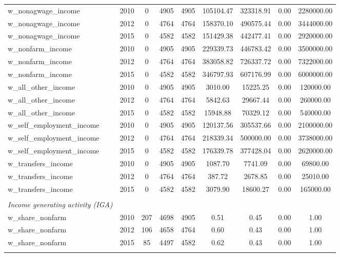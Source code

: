 \documentclass[a4paper,11pt]{article}
\begin{document}
\begin{table}[H]
{\begin{tabular}{lcccccccc}
   w\_nonagwage\_income & 2010  & 0     & 4905  & 4905  & 105104.47 & 323318.91 & 0.00  & 2280000.00 \\
    w\_nonagwage\_income & 2012  & 0     & 4764  & 4764  & 158370.10 & 490575.44 & 0.00  & 3444000.00 \\
    w\_nonagwage\_income & 2015  & 0     & 4582  & 4582  & 151429.38 & 442477.41 & 0.00  & 2920000.00 \\
    w\_nonfarm\_income & 2010  & 0     & 4905  & 4905  & 229339.73 & 446783.42 & 0.00  & 3500000.00 \\
    w\_nonfarm\_income & 2012  & 0     & 4764  & 4764  & 383058.82 & 726337.72 & 0.00  & 7322000.00 \\
    w\_nonfarm\_income & 2015  & 0     & 4582  & 4582  & 346797.93 & 607176.99 & 0.00  & 6000000.00 \\
w\_all\_other\_income & 2010  & 0     & 4905  & 4905  & 3010.00 & 15225.25 & 0.00  & 120000.00 \\
    w\_all\_other\_income & 2012  & 0     & 4764  & 4764  & 5842.63 & 29667.44 & 0.00  & 260000.00 \\
    w\_all\_other\_income & 2015  & 0     & 4582  & 4582  & 15948.88 & 70329.12 & 0.00  & 540000.00 \\
       w\_self\_employment\_income & 2010  & 0     & 4905  & 4905  & 120137.56 & 305537.66 & 0.00  & 2100000.00 \\
    w\_self\_employment\_income & 2012  & 0     & 4764  & 4764  & 218339.34 & 500000.00 & 0.00  & 3738000.00 \\
    w\_self\_employment\_income & 2015  & 0     & 4582  & 4582  & 176339.78 & 377428.04 & 0.00  & 2620000.00 \\
      w\_transfers\_income & 2010  & 0     & 4905  & 4905  & 1087.70 & 7741.09 & 0.00  & 69800.00 \\
    w\_transfers\_income & 2012  & 0     & 4764  & 4764  & 387.72 & 2678.85 & 0.00  & 25010.00 \\
    w\_transfers\_income & 2015  & 0     & 4582  & 4582  & 3079.90 & 18600.27 & 0.00  & 165000.00 \\
   
   

        & & & & & & & & \\

     \textit{Income generating activity (IGA)}  & & &  &  & & & \\ 
  w\_share\_nonfarm & 2010  & 207   & 4698  & 4905  & 0.51  & 0.45  & 0.00  & 1.00 \\
    w\_share\_nonfarm & 2012  & 106   & 4658  & 4764  & 0.60  & 0.43  & 0.00  & 1.00 \\
    w\_share\_nonfarm & 2015  & 85    & 4497  & 4582  & 0.62  & 0.43  & 0.00  & 1.00 \\
   
        \hline \\[-1.8ex] 

    \end{tabular}}%
  \label{tab:addlabel}%
\end{table}%
\end{document}
